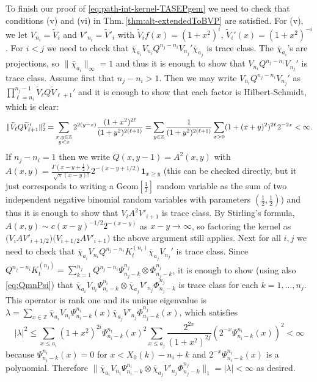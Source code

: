 \documentclass[letterpaper,reqno,11pt,oneside,final]{amsart}
\theoremstyle{definition}
\newcommand{\zz}{\mathbb{Z}}
\newcommand{\uno}[1]{\mathbf{1}_{#1}}
\newcommand{\wt}{\widetilde}
\newcommand{\ts}{\hspace{0.1em}}
\newcommand{\inv}[1]{\frac{1}{#1}}
\numberwithin{equation}{section}
\begin{document}
To finish our proof of \eqref{eq:path-int-kernel-TASEPgem} we need to check that conditions (v) and (vi) in Thm.\,\ref{thm:alt-extendedToBVP} are satisfied.
For (v), we let $V_{n_i}=\wt V_i$ and $V'_{n_i}=\wt V'_i$ with $\wt V_{i}f(x)=(1+x^2)^{i}$, $\wt V_{i}'(x)=(1+x^2)^{-i}$.
For $i<j$ we need to check that $\bar\chi_{a_i}V_{n_i}Q^{n_j-n_i}V_{n_j}'\bar\chi_{a_j}$ is trace class.
The $\bar\chi_{a_i}$'s are projections, so $\|\bar\chi_{a_i}\|_\infty=1$ and thus it is enough to show that $V_{n_i}Q^{n_j-n_i}V_{n_j}'$ is trace class.
Assume first that $n_j-n_i>1$.
Then we may write $V_{n_i}Q^{n_j-n_i}V_{n_j}'$ as $\prod_{\ell=n_i}^{n_j-1}\wt V_{\ell}Q\wt V_{\ell+1}'$ and it is enough to show that each factor is Hilbert-Schmidt, which is clear:
\[\|\wt V_{\ell}Q\wt V_{\ell+1}'\|_2^2=\sum_{\substack{x,y\in\zz\\y<x}}2^{2(y-x)}\frac{(1+x^2)^{2\ell}}{(1+y^2)^{2(\ell+1)}}
=\sum_{y\in\zz}\inv{(1+y^2)^{2(\ell+1)}}\sum_{x>0}(1+(x+y)^2)^{2\ell}\ts2^{-2x}<\infty.\]
If $n_j-n_i=1$ then we write $Q(x,y-1)=A^2(x,y)$ with $A(x,y)=\frac{\Gamma(x-y+\frac12)}{\sqrt{\pi}(x-y)!}2^{-(x-y+1/2)}\uno{x\geq y}$ (this can be checked directly, but it just corresponds to writing a Geom$[\frac12]$ random variable as the sum of two independent negative binomial random variables with parameters $(\frac12,\frac12)$) and thus it is enough to show that $V_iA^2V'_{i+1}$ is trace class.
By Stirling's formula, $A(x,y)\sim c(x-y)^{-1/2}2^{-(x-y)}$ as $x-y\to\infty$, so factoring the kernel as $\big(V_iAV'_{i+1/2}\big)\big(V_{i+1/2}AV'_{i+1}\big)$ the above argument still applies.
Next for all $i,j$ we need to check that $\bar\chi_{a_i}V_{n_i}Q^{n_j-n_i}K_t^{(n_i)}\bar\chi_{a_j}V_{n_j}'$ is trace class.
Since $Q^{n_j-n_i}K_t^{(n_j)}=\sum_{k=1}^{n_j}Q^{n_j-n_i}\Psi^{n_j}_{n_j-k}\otimes\Phi^{n_j}_{n_j-k}$, it is enough to show (using also \eqref{eq:QmnPsi}) that $\bar\chi_{a_i}V_{n_i}\Psi^{n_i}_{n_i-k}\otimes \bar\chi_{a_j}V'_{n_j}\Phi^{n_j}_{n_j-k}$ is trace class for each $k=1,\dotsc,n_j$.
This operator is rank one and its unique eigenvalue is $\lambda=\sum_{x\in\zz}\bar\chi_{a_i}V_{n_i}\Psi^{n_i}_{n_i-k}(x)\bar\chi_{a_j}V'_{n_j}\Phi^{n_j}_{n_j-k}(x)$, which satisfies
\[|\lambda|^2\leq\sum_{x\leq a_i}(1+x^2)^{2i}\Psi^{n_i}_{n_i-k}(x)^2\sum_{x\leq a_j}\frac{2^{2x}}{(1+x^2)^{2j}}(2^{-x}\Psi^{n_i}_{n_i-k}(x))^2<\infty\]
because $\Psi^{n_i}_{n_i-k}(x)=0$ for $x<X_0(k)-n_i+k$ and $2^{-x}\Psi^{n_i}_{n_i-k}(x)$ is a polynomial.
Therefore $\|\bar\chi_{a_i}V_{n_i}\Psi^{n_i}_{n_i-k}\otimes \bar\chi_{a_j}V'_{n_j}\Phi^{n_j}_{n_j-k}\|_1=|\lambda|<\infty$ as desired.
\end{document}
